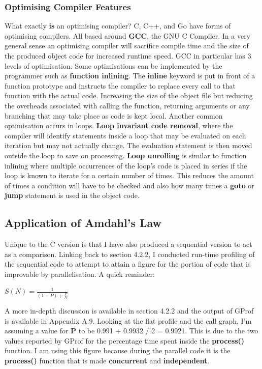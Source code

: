 \documentclass[11pt]{article} %
\begin{document}
\subsubsection{Optimising Compiler Features}
What exactly {\bf is} an optimising compiler? C, C++, and Go have forms of optimising compilers. All based around {\bf GCC}, the GNU C Compiler. In a very general sense an optimising compiler will sacrifice compile time and the size of the produced object code for increased runtime speed. GCC in particular has 3 levels of optimisation. Some optimisations can be implemented by the programmer such as {\bf function inlining}. The {\bf inline} keyword is put in front of a function prototype and instructs the compiler to replace every call to that function with the actual code. Increasing the size of the object file but reducing the overheads associated with calling the function, returning arguments or any branching that may take place as code is kept local. Another common optimisation occurs in loops. {\bf Loop invariant code removal}, where the compiler will identify statements inside a loop that may be evaluated on each iteration but may not actually change. The evaluation statement is then moved outside the loop to save on processing. {\bf Loop unrolling} is similar to function inlining where multiple occurrences of the loop's code is placed in series if the loop is known to iterate for a certain number of times. This reduces the amount of times a condition will have to be checked and also how many times a {\bf goto} or {\bf jump} statement is used in the object code.
\subsection{Application of Amdahl's Law}
Unique to the C version is that I have also produced a sequential version to act as a comparison. Linking back to section 4.2.2, I conducted run-time profiling of the sequential code to attempt to attain a figure for the portion of code that is improvable by parallelisation. A quick reminder:\\
\smallskip
\centerline{$ S(N) = \frac{1}{(1-P) + \frac{P}{N}} $}

A more in-depth discussion is available in section 4.2.2 and the output of GProf is available in Appendix A.9. Looking at the flat profile and the call graph, I'm assuming a value for {\bf P} to be 0.991 + 0.9932 / 2 = 0.9921. This is due to the two values reported by GProf for the percentage time spent inside the {\bf process()} function. I am using this figure because during the parallel code it is the {\bf process()} function that is made {\bf concurrent} and {\bf independent}.
\end{document}
